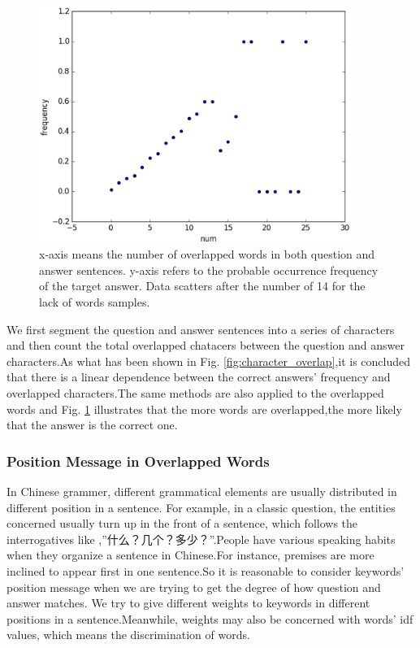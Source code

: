\documentclass{llncs}
\begin{document}
\begin{figure}
\centering
\includegraphics[width=4in]{figures/word_overlap.eps}
\caption{x-axis means the number of overlapped words in both question and answer sentences. y-axis refers to the probable occurrence frequency of the target answer. Data scatters after the number of 14 for the lack of words samples.}
\label{fig:word_overlap}
\end{figure}

We first segment the question and answer sentences into a series of characters and then count the total overlapped chatacers between the question and answer characters.As what has been shown in Fig. \ref{fig:character_overlap},it is concluded that there is a linear dependence between the correct answers’ frequency and overlapped characters.The same methods are also applied to the overlapped words and Fig. \ref{fig:word_overlap} illustrates that the more words are overlapped,the more likely that the answer is the correct one.

\subsubsection{Position Message in Overlapped Words}
In Chinese grammer, different grammatical elements are usually distributed in different position in a sentence. For example, in a classic question, the entities concerned usually turn up in the front of a sentence, which follows the interrogatives like ,”什么？几个？多少？”.People have various speaking habits when they organize a sentence in Chinese.For instance, premises are more inclined to appear first in one sentence.So it is reasonable to consider keywords’ position message when we are trying to get the degree of how question and answer matches. We try to give different weights to keywords in different positions in a sentence.Meanwhile, weights may also be concerned with words’ idf values, which means the discrimination of words.
\end{document}
